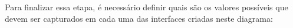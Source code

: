 Para finalizar essa etapa, é necessário definir quais são os valores possíveis que devem ser capturados em cada uma das interfaces criadas neste diagrama:

